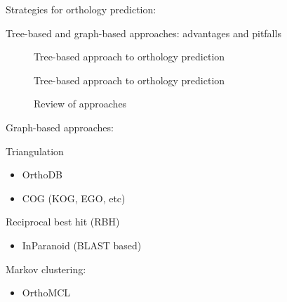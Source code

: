 Strategies for orthology prediction:

Tree-based and graph-based approaches: advantages and pitfalls

\begin{description}
	\item[\cite{mirkin1995}] Tree-based approach to orthology prediction
	\item[\cite{yuan1998}] Tree-based approach to orthology prediction
	\item[\cite{kuzniar2008}] Review of approaches
\end{description}

Graph-based approaches:

Triangulation

\begin{itemize}
	\item OrthoDB 
	\item COG (KOG, EGO, etc)
\end{itemize}

Reciprocal best hit (RBH) 

\begin{itemize}
	\item InParanoid (BLAST based)
\end{itemize}

Markov clustering:

\begin{itemize}
	\item OrthoMCL
\end{itemize}

